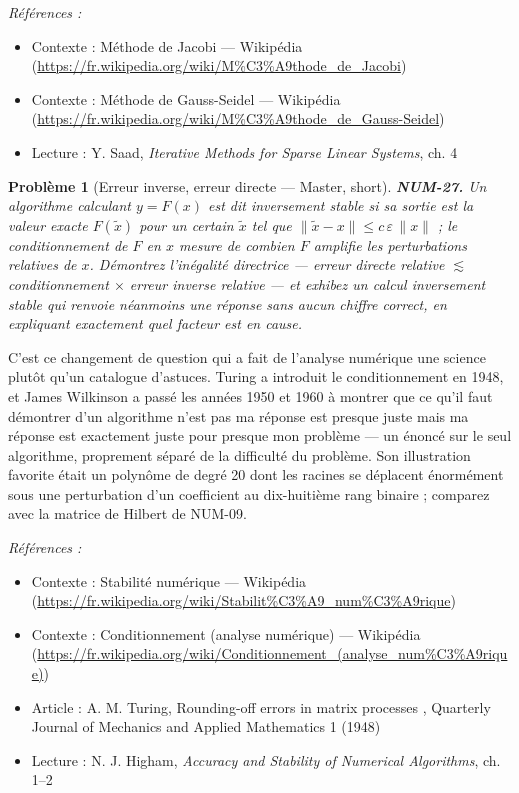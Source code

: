 \documentclass[11pt]{article}
\newtheorem{problem}{Problème}
\newenvironment{refs}{\par\small\noindent\emph{Références :}\begin{itemize}\setlength\itemsep{0pt}}{\end{itemize}\normalsize}
\begin{document}
\begin{refs}
\item Contexte : Méthode de Jacobi --- Wikipédia (\url{https://fr.wikipedia.org/wiki/M%C3%A9thode_de_Jacobi})
\item Contexte : Méthode de Gauss-Seidel --- Wikipédia (\url{https://fr.wikipedia.org/wiki/M%C3%A9thode_de_Gauss-Seidel})
\item Lecture : Y. Saad, \textit{Iterative Methods for Sparse Linear Systems}, ch. 4
\end{refs}

\bigskip

\begin{problem}[{Erreur inverse, erreur directe --- Master, short}]
\textbf{NUM-27.} Un algorithme calculant $y = F(x)$ est dit \textit{inversement stable} si sa sortie est la valeur exacte $F(\tilde{x})$ pour un certain $\tilde{x}$ tel que $\|\tilde{x} - x\| \le c\,\varepsilon\,\|x\|$ ; le conditionnement de $F$ en $x$ mesure de combien $F$ amplifie les perturbations relatives de $x$. Démontrez l'inégalité directrice --- erreur directe relative $\lesssim$ conditionnement $\times$ erreur inverse relative --- et exhibez un calcul inversement stable qui renvoie néanmoins une réponse sans aucun chiffre correct, en expliquant exactement quel facteur est en cause.
\end{problem}

\noindent C'est ce changement de question qui a fait de l'analyse numérique une science plutôt qu'un catalogue d'astuces. Turing a introduit le conditionnement en 1948, et James Wilkinson a passé les années 1950 et 1960 à montrer que ce qu'il faut démontrer d'un algorithme n'est pas \og{} ma réponse est presque juste \fg{} mais \og{} ma réponse est exactement juste pour presque mon problème \fg{} --- un énoncé sur le seul algorithme, proprement séparé de la difficulté du problème. Son illustration favorite était un polynôme de degré 20 dont les racines se déplacent énormément sous une perturbation d'un coefficient au dix-huitième rang binaire ; comparez avec la matrice de Hilbert de NUM-09.

\begin{refs}
\item Contexte : Stabilité numérique --- Wikipédia (\url{https://fr.wikipedia.org/wiki/Stabilit%C3%A9_num%C3%A9rique})
\item Contexte : Conditionnement (analyse numérique) --- Wikipédia (\url{https://fr.wikipedia.org/wiki/Conditionnement_(analyse_num%C3%A9rique)})
\item Article : A. M. Turing, \og{} Rounding-off errors in matrix processes \fg{}, Quarterly Journal of Mechanics and Applied Mathematics 1 (1948)
\item Lecture : N. J. Higham, \textit{Accuracy and Stability of Numerical Algorithms}, ch. 1--2
\end{refs}
\end{document}
